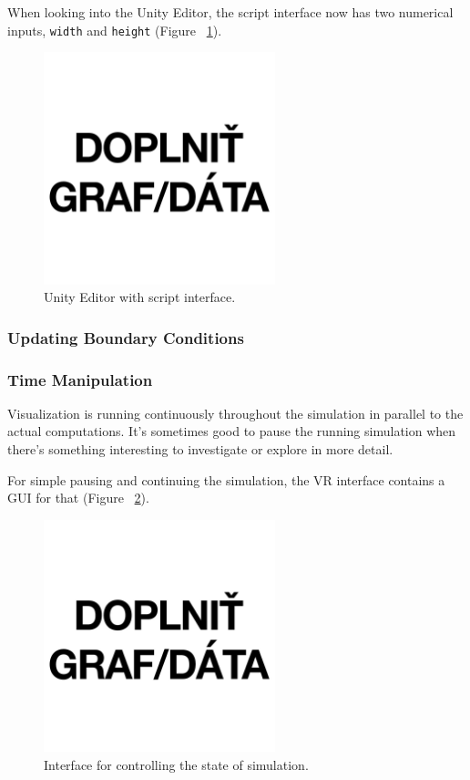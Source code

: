 When looking into the Unity Editor, the script interface now has two numerical inputs, \texttt{width} and \texttt{height} (Figure~ \ref{fig:unity-script-interface-public-vars}).

\begin{figure}[!ht]
	\centering
	\includegraphics[width=0.6\textwidth]{figures/empty.jpg}
	\caption{Unity Editor with script interface.}
	\label{fig:unity-script-interface-public-vars}
\end{figure}


\subsubsection{Updating Boundary Conditions}

\subsubsection{Time Manipulation}

Visualization is running continuously throughout the simulation in parallel to the actual computations. It's sometimes good to pause the running simulation when there's something interesting to investigate or explore in more detail.

For simple pausing and continuing the simulation, the VR interface contains a GUI for that (Figure~ \ref{fig:unity-pause-play}).

\begin{figure}[!ht]
	\centering
	\includegraphics[width=0.6\textwidth]{figures/empty.jpg}
	\caption{Interface for controlling the state of simulation.}
	\label{fig:unity-pause-play}
\end{figure}

